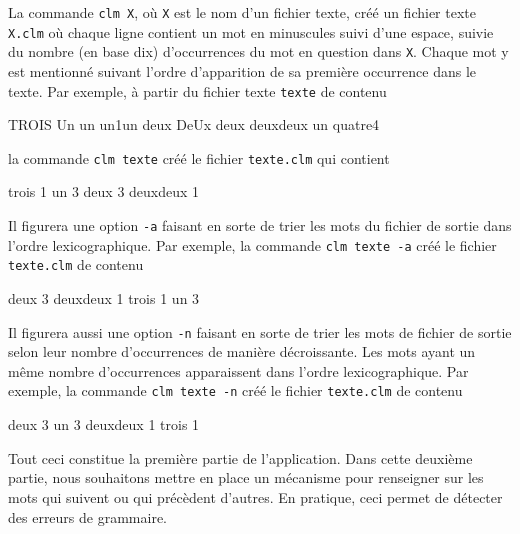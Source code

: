 \documentclass[11pt]{article}
\theoremstyle{definition}
\begin{document}
La commande {\tt clm X}, où {\tt X} est le nom d'un fichier texte, créé
un fichier texte {\tt X.clm} où chaque ligne contient un mot en
minuscules suivi d'une espace, suivie du nombre (en base dix)
d'occurrences du mot en question dans {\tt X}. Chaque mot y est mentionné
suivant l'ordre d'apparition de sa première occurrence dans le texte.
Par exemple, à partir du fichier texte {\tt texte} de contenu
\begin{center} \footnotesize
\begin{boxedverbatim}
TROIS Un un un1un deux DeUx
deux deuxdeux un quatre4
\end{boxedverbatim}
\end{center}
la commande {\tt clm texte} créé le fichier {\tt texte.clm} qui contient
\begin{center} \footnotesize
\begin{boxedverbatim}
trois 1
un 3
deux 3
deuxdeux 1
\end{boxedverbatim}
\end{center}
\medskip

Il figurera une option {\tt -a} faisant en sorte de trier les mots du
fichier de sortie dans l'ordre lexicographique. Par exemple, la commande
{\tt clm texte -a} créé le fichier {\tt texte.clm} de contenu
\begin{center} \footnotesize
\begin{boxedverbatim}
deux 3
deuxdeux 1
trois 1
un 3
\end{boxedverbatim}
\end{center}
Il figurera aussi une option {\tt -n} faisant en sorte de trier les mots
de fichier de sortie selon leur nombre d'occurrences de manière
décroissante. Les mots ayant un même nombre d'occurrences apparaissent
dans l'ordre lexicographique. Par exemple, la commande {\tt clm texte -n}
créé le fichier {\tt texte.clm} de contenu
\begin{center} \footnotesize
\begin{boxedverbatim}
deux 3
un 3
deuxdeux 1
trois 1
\end{boxedverbatim}
\end{center}
\medskip

Tout ceci constitue la première partie de l'application. Dans cette
deuxième partie, nous souhaitons mettre en place un mécanisme pour
renseigner sur les mots qui suivent ou qui précèdent d'autres. En
pratique, ceci permet de détecter des erreurs de grammaire.
\medskip
\end{document}
